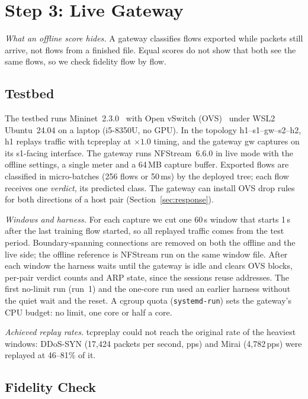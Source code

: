 \section{Step 3: Live Gateway}\label{sec:live}

\emph{What an offline score hides.} A gateway classifies flows exported while packets still arrive, not flows from a finished file. Equal scores do not show that both see the same flows, so we check fidelity flow by flow.

\subsection{Testbed}\label{sec:testbed}

The testbed runs Mininet~2.3.0~\cite{lantz2010mininet} with Open vSwitch (OVS)~\cite{pfaff2015ovs} under WSL2 Ubuntu~24.04 on a laptop (i5-8350U, no GPU). In the topology h1--s1--gw--s2--h2, h1 replays traffic with tcpreplay at $\times1.0$ timing, and the gateway gw captures on its s1-facing interface. The gateway runs NFStream~6.6.0 in live mode with the offline settings, a single meter and a 64\,MB capture buffer. Exported flows are classified in micro-batches (256 flows or 50\,ms) by the deployed tree; each flow receives one \emph{verdict}, its predicted class. The gateway can install OVS drop rules for both directions of a host pair (Section~\ref{sec:response}).

\emph{Windows and harness.} For each capture we cut one 60\,s window that starts 1\,s after the last training flow started, so all replayed traffic comes from the test period. Boundary-spanning connections are removed on both the offline and the live side; the offline reference is NFStream run on the same window file. After each window the harness waits until the gateway is idle and clears OVS blocks, per-pair verdict counts and ARP state, since the sessions reuse addresses. The first no-limit run (run~1) and the one-core run used an earlier harness without the quiet wait and the reset. A cgroup quota (\texttt{systemd-run}) sets the gateway's CPU budget: no limit, one core or half a core.

\emph{Achieved replay rates.} tcpreplay could not reach the original rate of the heaviest windows: DDoS-SYN (17,424 packets per second, pps) and Mirai (4,782\,pps) were replayed at 46--81\% of it.

\subsection{Fidelity Check}\label{sec:fidelity}

